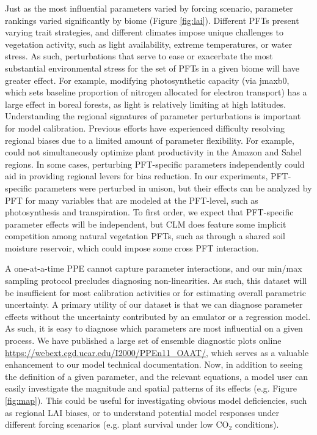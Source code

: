 \documentclass[draft]{agujournal2019}
\begin{document}
Just as the most influential parameters varied by forcing scenario, parameter rankings varied significantly by biome (Figure \ref{fig:lai}). Different PFTs present varying trait strategies, and different climates impose unique challenges to vegetation activity, such as light availability, extreme temperatures, or water stress. As such, perturbations that serve to ease or exacerbate the most substantial environmental stress for the set of PFTs in a given biome will have greater effect. For example, modifying photosynthetic capacity (via jmaxb0, which sets baseline proportion of nitrogen allocated for electron transport) has a large effect in boreal forests, as light is relatively limiting at high latitudes.  Understanding the regional signatures of parameter perturbations is important for model calibration. Previous efforts have experienced difficulty resolving regional biases due to a limited amount of parameter flexibility. For example, \cite{dagon2020} could not simultaneously optimize plant productivity in the Amazon and Sahel regions. In some cases, perturbing PFT-specific parameters independently could aid in providing regional levers for bias reduction. In our experiments, PFT-specific parameters were perturbed in unison, but their effects can be analyzed by PFT for many variables that are modeled at the PFT-level, such as photosynthesis and transpiration. To first order, we expect that PFT-specific parameter effects will be independent, but CLM does feature some implicit competition among natural vegetation PFTs, such as through a shared soil moisture reservoir, which could impose some cross PFT interaction. 

A one-at-a-time PPE cannot capture parameter interactions, and our min/max sampling protocol precludes diagnosing non-linearities. As such, this dataset will be insufficient for most calibration activities or for estimating overall parametric uncertainty. A primary utility of our dataset is that we can diagnose parameter effects without the uncertainty contributed by an emulator or a regression model. As such, it is easy to diagnose which parameters are most influential on a given process. We have published a large set of ensemble diagnostic plots online \url{https://webext.cgd.ucar.edu/I2000/PPEn11_OAAT/}\add{)}, which serves as a valuable enhancement to our model technical documentation. Now, in addition to seeing the definition of a given parameter, and the relevant equations, a model user can easily investigate the magnitude and spatial patterns of its effects (e.g. Figure \ref{fig:map}). This could be useful for investigating obvious model deficiencies, such as regional LAI biases, or to understand potential model responses under different forcing scenarios (e.g. plant survival under low CO$_2$ conditions).  
\end{document}
